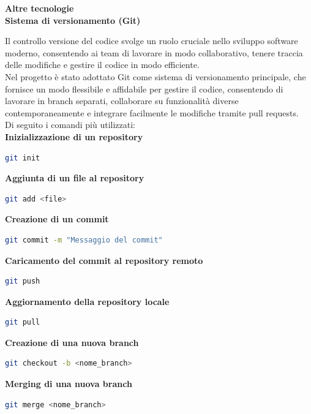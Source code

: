 \documentclass[a4paper, 12pt]{book}
\begin{document}
{\Large\textbf{Altre tecnologie}}\\

\textbf{Sistema di versionamento (Git)}

Il controllo versione del codice svolge un ruolo cruciale nello sviluppo software moderno, consentendo ai team di lavorare in
modo collaborativo, tenere traccia delle modifiche e gestire il codice in modo efficiente.\\

Nel progetto è stato adottato Git \cite{Git} come sistema di versionamento principale, che fornisce un modo flessibile e affidabile per gestire
il codice, consentendo di lavorare in branch separati, collaborare su funzionalità diverse contemporaneamente e integrare facilmente
le modifiche tramite pull requests.\\

Di seguito i comandi più utilizzati:\\

{\small\textbf{Inizializzazione di un repository}}
\begin{lstlisting}[language=bash]
    git init
  \end{lstlisting}

{\small\textbf{Aggiunta di un file al repository}}
\begin{lstlisting}[language=bash]
    git add <file>
  \end{lstlisting}

{\small\textbf{Creazione di un commit}}
\begin{lstlisting}[language=bash]
    git commit -m "Messaggio del commit"
  \end{lstlisting}

{\small\textbf{Caricamento del commit al repository remoto}}
\begin{lstlisting}[language=bash]
    git push
  \end{lstlisting}

{\small\textbf{Aggiornamento della repository locale}}
\begin{lstlisting}[language=bash]
    git pull
  \end{lstlisting}

{\small\textbf{Creazione di una nuova branch}}
\begin{lstlisting}[language=bash]
    git checkout -b <nome_branch>
  \end{lstlisting}

{\small\textbf{Merging di una nuova branch}}
\begin{lstlisting}[language=bash]
  git merge <nome_branch>
  \end{lstlisting}
\end{document}
